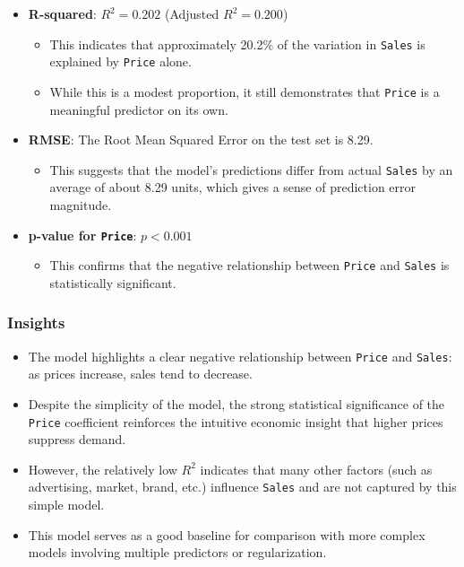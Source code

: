 \documentclass[12pt]{article}
\begin{document}
\begin{itemize}
    \item \textbf{R-squared}: $R^2 = 0.202$ (Adjusted $R^2 = 0.200$)
    \begin{itemize}
        \item This indicates that approximately 20.2\% of the variation in \texttt{Sales} is explained by \texttt{Price} alone.
        \item While this is a modest proportion, it still demonstrates that \texttt{Price} is a meaningful predictor on its own.
    \end{itemize}
    \item \textbf{RMSE}: The Root Mean Squared Error on the test set is 8.29.
    \begin{itemize}
        \item This suggests that the model’s predictions differ from actual \texttt{Sales} by an average of about 8.29 units, which gives a sense of prediction error magnitude.
    \end{itemize}
    \item \textbf{p-value for \texttt{Price}}: $p < 0.001$
    \begin{itemize}
        \item This confirms that the negative relationship between \texttt{Price} and \texttt{Sales} is statistically significant.
    \end{itemize}
\end{itemize}

\subsubsection*{Insights}

\begin{itemize}
    \item The model highlights a clear negative relationship between \texttt{Price} and \texttt{Sales}: as prices increase, sales tend to decrease.
    \item Despite the simplicity of the model, the strong statistical significance of the \texttt{Price} coefficient reinforces the intuitive economic insight that higher prices suppress demand.
    \item However, the relatively low $R^2$ indicates that many other factors (such as advertising, market, brand, etc.) influence \texttt{Sales} and are not captured by this simple model.
    \item This model serves as a good baseline for comparison with more complex models involving multiple predictors or regularization.
\end{itemize}
\end{document}
